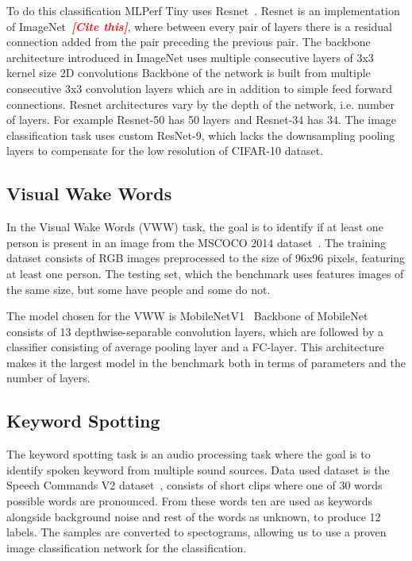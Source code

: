\documentclass[12pt,a4paper,english
]{tunithesis}
\newcommand{\fixthis}[1]{\textbf{\textit{\textcolor{red}{[#1]}}}}
\begin{document}
To do this classification MLPerf Tiny uses Resnet~\cite{he2015deepresiduallearningimage}. Resnet is an implementation of ImageNet~\fixthis{Cite this}, where between every pair of layers there is a residual connection added from the pair preceding the previous pair.
The backbone architecture introduced in ImageNet uses multiple consecutive layers of 3x3 kernel size 2D convolutions
Backbone of the network is built from multiple consecutive 3x3 convolution layers which are in addition to simple feed forward connections.
Resnet architectures vary by the depth of the network, i.e. number of layers. For example Resnet-50 has 50 layers and Resnet-34 has 34. The image classification task uses custom ResNet-9, which lacks the downsampling pooling layers to compensate for the low resolution of CIFAR-10 dataset.

\subsection{Visual Wake Words}
In the Visual Wake Words (VWW) task, the goal is to identify if at least one person is present in an image from the MSCOCO 2014 dataset~\cite{lin_microsoft_2015}.
The training dataset consists of RGB images preprocessed to the size of 96x96 pixels, featuring at least one person. The testing set, which the benchmark uses features images of the same size, but some have people and some do not.

The model chosen for the VWW is MobileNetV1~\cite{howard2017mobilenetsefficientconvolutionalneural}
Backbone of MobileNet consists of 13 depthwise-separable convolution layers, which are followed by a classifier consisting of average pooling layer and a FC-layer. This architecture makes it the largest model in the benchmark both in terms of parameters and the number of layers.

\subsection{Keyword Spotting}
The keyword spotting task is an audio processing task where the goal is to identify spoken keyword from multiple sound sources. Data used dataset is the Speech Commands V2 dataset~\cite{warden_speech_2018}, consists of short clips where one of 30 words possible words are pronounced. From these words ten are used as keywords alongside background noise and rest of the words as unknown, to produce 12 labels. The samples are converted to spectograms, allowing us to use a proven image classification network for the classification.
\end{document}
